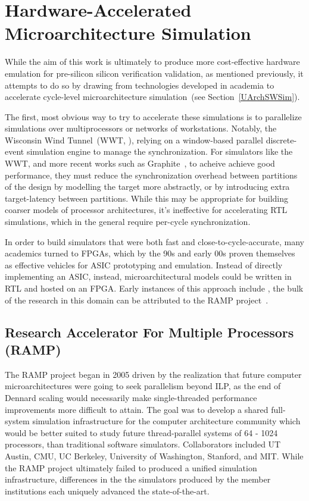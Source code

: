 \section{Hardware-Accelerated Microarchitecture Simulation}

While the aim of this work is ultimately to produce more cost-effective hardware emulation for 
pre-silicon silicon verification validation, as mentioned previously, it attempts to do so by drawing
from technologies developed in academia to accelerate cycle-level microarchitecture simulation~(see Section~\ref{UArchSWSim}).

The first, most obvious way to try to accelerate these simulations is to
parallelize simulations over multiprocessors or networks of workstations.
Notably, the Wisconsin Wind Tunnel~(WWT, \cite{WisconsinWindTunnel}), relying
on a window-based parallel discrete-event simulation engine to manage the
synchronization. For simulators like the WWT, and more recent works such as Graphite~\cite{Graphite}, to acheive achieve
good performance, they must reduce the synchronization overhead between
partitions of the design by modelling the target more abstractly, or by
introducing extra target-latency between partitions.  While this may be
appropriate for building coarser models of processor architectures, it's
ineffective for accelerating RTL simulations, which in the general require
per-cycle synchronization.

In order to build simulators that were both fast and close-to-cycle-accurate,
many academics turned to FPGAs, which by the 90s and early 00s proven themselves as effective
vehicles for ASIC prototyping and emulation. Instead of directly implementing an
ASIC, instead, microarchitectural models could be written in RTL and
hosted on an FPGA. Early instances of this approach include , the bulk 
of the research in this domain can be attributed to the RAMP project~\cite{RAMP}.

\subsection{Research Accelerator For Multiple Processors (RAMP)}

The RAMP project began in 2005 driven by the realization that future computer
microarchitectures were going to seek parallelism beyond ILP, as the end of
Dennard scaling would necessarily make single-threaded performance improvements
more difficult to attain. The goal was to develop a shared full-system
simulation infrastructure for the computer architecture community which would
be better suited to study future thread-parallel systems of 64 - 1024
processors, than traditional software simulators. Collaborators included UT
Austin, CMU, UC Berkeley, University of Washington, Stanford, and MIT.  While
the RAMP project ultimately failed to produced a unified simulation
infrastructure, differences in the the simulators produced by the member
institutions each uniquely advanced the state-of-the-art.

